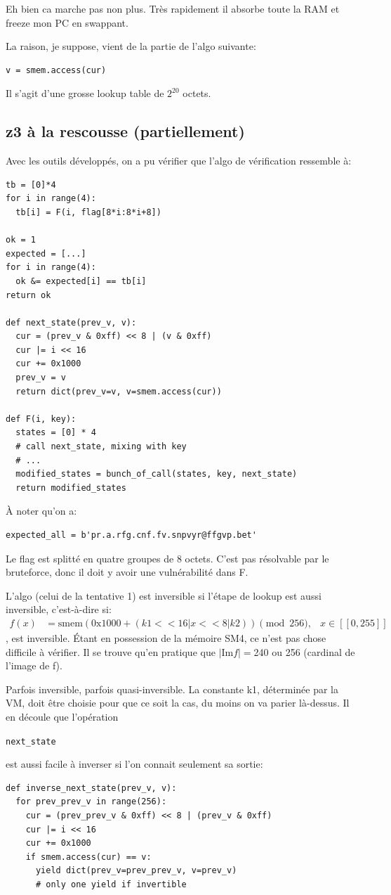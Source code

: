 \documentclass[14pt]{article}
\newcommand{\inlinebox}[2]{%
\colorbox{bg}{%
\parbox[b][0.6em]{\widthof{\texttt{#2}}}{\texttt{#2}}
}
}
\newcommand{\inlinepython}[1]{ \inlinebox{python}{#1} }
\theoremstyle{definition}
\begin{document}
Eh bien ca marche pas non plus. Très rapidement il absorbe toute la RAM et freeze mon PC en swappant.

La raison, je suppose, vient de la partie de l'algo suivante:
\begin{verbatim}
v = smem.access(cur)
\end{verbatim}
Il s'agit d'une grosse lookup table de $2^{20}$ octets.


\subsection{\:\:z3 à la rescousse (partiellement)}

Avec les outils développés, on a pu vérifier que l'algo de vérification ressemble à:
\begin{verbatim}
tb = [0]*4
for i in range(4):
  tb[i] = F(i, flag[8*i:8*i+8])

ok = 1
expected = [...]
for i in range(4):
  ok &= expected[i] == tb[i]
return ok

def next_state(prev_v, v):
  cur = (prev_v & 0xff) << 8 | (v & 0xff)
  cur |= i << 16
  cur += 0x1000
  prev_v = v
  return dict(prev_v=v, v=smem.access(cur))

def F(i, key):
  states = [0] * 4
  # call next_state, mixing with key
  # ...
  modified_states = bunch_of_call(states, key, next_state)
  return modified_states

\end{verbatim}


À noter qu'on a:
\begin{verbatim}
expected_all = b'pr.a.rfg.cnf.fv.snpvyr@ffgvp.bet'
\end{verbatim}


Le flag est splitté en quatre groupes de 8 octets. C'est pas résolvable par le bruteforce, donc il doit y avoir une vulnérabilité dans F.


L'algo (celui de la tentative 1) est inversible si l'étape de lookup est aussi inversible, c'est-à-dire si:
\begin{align*}
  f(x)&=\text{smem}(\text{0x1000} + (k1 << 16 | x << 8 | k2)) \pmod{256} ,&x  \in [[0, 255]]
\end{align*}, est inversible.
Étant en possession de la mémoire SM4, ce n'est pas chose difficile à vérifier. Il se trouve qu'en pratique que $|\text{Im} f| = $240 ou 256 (cardinal de l'image de f).

Parfois inversible, parfois quasi-inversible. La constante k1, déterminée par la VM, doit être choisie pour que ce soit la cas, du moins on va parier là-dessus.
Il en découle que l'opération \inlinepython{next_state} est aussi facile à inverser si l'on connait seulement sa sortie:
\begin{verbatim}
def inverse_next_state(prev_v, v):
  for prev_prev_v in range(256):
    cur = (prev_prev_v & 0xff) << 8 | (prev_v & 0xff)
    cur |= i << 16
    cur += 0x1000
    if smem.access(cur) == v:
      yield dict(prev_v=prev_prev_v, v=prev_v)
      # only one yield if invertible
\end{verbatim}
\end{document}
